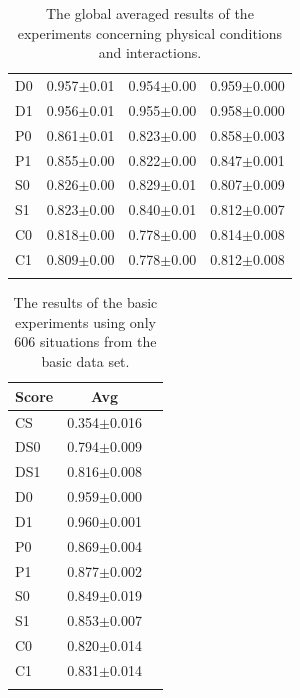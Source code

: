 \begin{table}
\begin{tabular}{lccc}
D0       &0.957$\pm$0.01&0.954$\pm$0.00&0.959$\pm$0.000\\%
D1       &0.956$\pm$0.01&0.955$\pm$0.00&0.958$\pm$0.000\\%
P0       &0.861$\pm$0.01&0.823$\pm$0.00&0.858$\pm$0.003\\%
P1       &0.855$\pm$0.00&0.822$\pm$0.00&0.847$\pm$0.001\\%
S0       &0.826$\pm$0.00&0.829$\pm$0.01&0.807$\pm$0.009\\%
S1       &0.823$\pm$0.00&0.840$\pm$0.01&0.812$\pm$0.007\\%
C0       &0.818$\pm$0.00&0.778$\pm$0.00&0.814$\pm$0.008\\%
C1       &0.809$\pm$0.00&0.778$\pm$0.00&0.812$\pm$0.008\\%
\lspbottomrule
\end{tabular}
\caption{The global averaged results of the experiments concerning physical conditions and interactions.}
\label{t:par:int}
\end{table}

\begin{table}[t]
\centering
\begin{tabular}{lcc}
\lsptoprule
Score & Avg\\\midrule
CS & 0.354$\pm$0.016\\%
DS0 & 0.794$\pm$0.009\\%
DS1 & 0.816$\pm$0.008\\%
D0 & 0.959$\pm$0.000\\%
D1 & 0.960$\pm$0.001\\%
P0 & 0.869$\pm$0.004\\%
P1 & 0.877$\pm$0.002\\%
S0 & 0.849$\pm$0.019\\%
S1 & 0.853$\pm$0.007\\%
C0 & 0.820$\pm$0.014\\%
C1 & 0.831$\pm$0.014\\%
\lspbottomrule
\end{tabular}
\caption{The results of the basic experiments using only 606 situations from the basic data set.}
\label{t:int:basis606}
\end{table}


